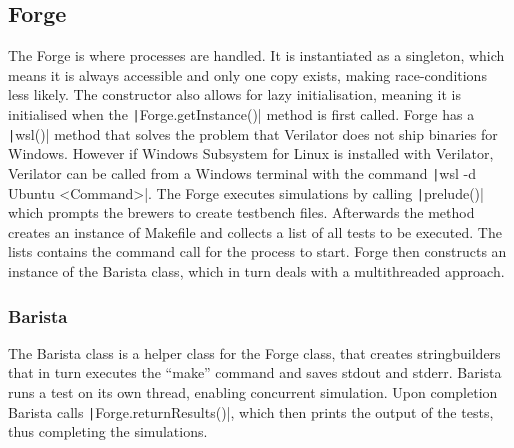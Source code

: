 \subsection{Forge}
The Forge is where processes are handled. It is instantiated as a singleton, which means it is always accessible and only one copy exists, making race-conditions less likely. The constructor also allows for lazy initialisation, meaning it is initialised when the \texttt|Forge.getInstance()| method is first called.\newline
Forge has a \texttt|wsl()| method that solves the problem that Verilator does not ship binaries for Windows. However if Windows Subsystem for Linux is installed with Verilator, Verilator can be called from a Windows terminal with the command \texttt|wsl -d Ubuntu <Command>|.
The Forge executes simulations by calling \texttt|prelude()| which prompts the brewers to create testbench files. Afterwards the method creates an instance of Makefile and collects a list of all tests to be executed. The lists contains the command call for the process to start. Forge then constructs an instance of the Barista class, which in turn deals with a multithreaded approach.
\subsubsection{Barista}
The Barista class is a helper class for the Forge class, that creates stringbuilders that in turn executes the ``make'' command and saves stdout and stderr. Barista runs a test on its own thread, enabling concurrent simulation. Upon completion Barista calls \texttt|Forge.returnResults()|, which then prints the output of the tests, thus completing the simulations.
